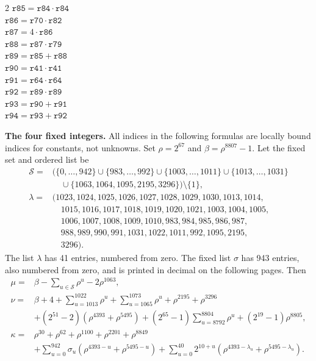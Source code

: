 \documentclass[10pt]{article}
\begin{document}
\begin{multicols}{2}
\(\mathtt{r85} = \mathtt{r84} \cdot \mathtt{r84}\)\\
\(\mathtt{r86} = \mathtt{r70} \cdot \mathtt{r82}\)\\
\(\mathtt{r87} = 4 \cdot \mathtt{r86}\)\\
\(\mathtt{r88} = \mathtt{r87} \cdot \mathtt{r79}\)\\
\(\mathtt{r89} = \mathtt{r85} + \mathtt{r88}\)\\
\(\mathtt{r90} = \mathtt{r41} \cdot \mathtt{r41}\)\\
\(\mathtt{r91} = \mathtt{r64} \cdot \mathtt{r64}\)\\
\(\mathtt{r92} = \mathtt{r89} \cdot \mathtt{r89}\)\\
\(\mathtt{r93} = \mathtt{r90} + \mathtt{r91}\)\\
\(\mathtt{r94} = \mathtt{r93} + \mathtt{r92}\)\\
\end{multicols}
\clearpage
\textbf{The four fixed integers.} All indices in the following formulas are
locally bound indices for constants, not unknowns. Set \(\rho=2^{67}\) and
\(\beta=\rho^{8807}-1\). Let the fixed set and ordered list be
\[
\begin{aligned}
\mathcal S={}&\bigl(\{0,\ldots,942\}\cup\{983,\ldots,992\}\cup
\{1003,\ldots,1011\}\cup\{1013,\ldots,1031\}\\
&\quad\cup\{1063,1064,1095,2195,3296\}\bigr)\setminus\{1\},\\
\lambda={}&(1023,1024,1025,1026,1027,1028,1029,1030,1013,1014,\\
&\quad 1015,1016,1017,1018,1019,1020,1021,1003,1004,1005,\\
&\quad 1006,1007,1008,1009,1010,983,984,985,986,987,\\
&\quad 988,989,990,991,1031,1022,1011,992,1095,2195,\\
&\quad 3296).
\end{aligned}
\]
The list \(\lambda\) has 41 entries, numbered from zero. The fixed list
\(\sigma\) has 943 entries, also numbered from zero, and is printed in
decimal on the following pages. Then
\[
\begin{aligned}
\mu={}&\beta-\sum_{u\in\mathcal S}\rho^u-2\rho^{1063},\\
\nu={}&\beta+4+\sum_{u=1013}^{1022}\rho^u+\sum_{u=1065}^{1073}\rho^u
 +\rho^{2195}+\rho^{3296}\\
&+(2^{51}-2)(\rho^{4393}+\rho^{5495})
 +(2^{65}-1)\sum_{u=8792}^{8804}\rho^u+(2^{19}-1)\rho^{8805},\\
\kappa={}&\rho^{30}+\rho^{62}+\rho^{1100}+\rho^{2201}+\rho^{8849}\\
&+\sum_{u=0}^{942}\sigma_u(\rho^{4393-u}+\rho^{5495-u})
 +\sum_{u=0}^{40}2^{10+u}(\rho^{4393-\lambda_u}+\rho^{5495-\lambda_u}).
\end{aligned}
\]
\end{document}
